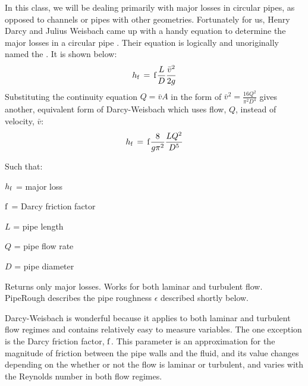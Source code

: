 \documentclass[letterpaper,10pt,english]{sphinxmanual}
\begin{document}
In this class, we will be dealing primarily with major losses in circular pipes, as opposed to channels or pipes with other geometries. Fortunately for us, Henry Darcy and Julius Weisbach came up with a handy equation to determine the major losses in a circular pipe . Their equation is logically and unoriginally named the . It is shown below:
\begin{equation}\label{equation:Review/Review_Fluid_Mechanics:darcy_weisbach}
\begin{split}  h_{\rm{f}} \, = \, {\rm{f}} \frac{L}{D} \frac{\bar v^2}{2g}\end{split}
\end{equation}
Substituting the continuity equation \(Q = \bar vA\) in the form of \(\bar v^2 = \frac{16Q^2}{\pi^2 D^4}\) gives another, equivalent form of Darcy-Weisbach which uses flow, \(Q\), instead of velocity, \(\bar v\):
\begin{equation}\label{equation:Review/Review_Fluid_Mechanics:Review/Review_Fluid_Mechanics:5}
\begin{split}h_{\rm{f}} \, = \,{\rm{f}} \frac{8}{g \pi^2} \frac{LQ^2}{D^5}\end{split}
\end{equation}
\begin{DUlineblock}{0em}
\item[] Such that:
\item[] \(h_{\rm{f}}\) = major loss
\item[] \(\rm{f}\) = Darcy friction factor
\item[] \(L\) = pipe length
\item[] \(Q\) = pipe flow rate
\item[] \(D\) = pipe diameter
\end{DUlineblock}




  Returns only major losses. Works for both laminar and turbulent flow. PipeRough describes the pipe roughness \(\epsilon\) described shortly below.



Darcy-Weisbach is wonderful because it applies to both laminar and turbulent flow regimes and contains relatively easy to measure variables. The one exception is the Darcy friction factor, \(\rm{f}\). This parameter is an approximation for the magnitude of friction between the pipe walls and the fluid, and its value changes depending on the whether or not the flow is laminar or turbulent, and varies with the Reynolds number in both flow regimes.
\end{document}
